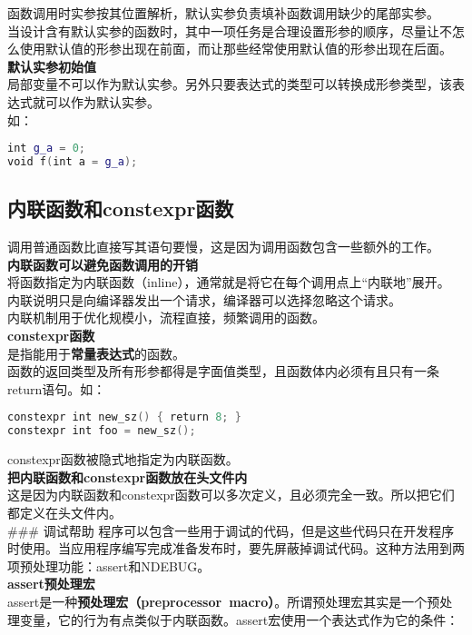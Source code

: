 \documentclass[
  a4paper,
  oneside,tablecaptionabove
]{scrbook}
\begin{document}
函数调用时实参按其位置解析，默认实参负责填补函数调用缺少的尾部实参。\\
当设计含有默认实参的函数时，其中一项任务是合理设置形参的顺序，尽量让不怎么使用默认值的形参出现在前面，而让那些经常使用默认值的形参出现在后面。\\
\textbf{默认实参初始值}\\
局部变量不可以作为默认实参。另外只要表达式的类型可以转换成形参类型，该表达式就可以作为默认实参。\\
如：

\begin{lstlisting}[language={C++}]
int g_a = 0;
void f(int a = g_a);
\end{lstlisting}

\subsection{内联函数和constexpr函数}\label{ux5185ux8054ux51fdux6570ux548cconstexprux51fdux6570}

调用普通函数比直接写其语句要慢，这是因为调用函数包含一些额外的工作。\\
\textbf{内联函数可以避免函数调用的开销}\\
将函数指定为内联函数（inline），通常就是将它在每个调用点上\enquote{内联地}展开。\\
内联说明只是向编译器发出一个请求，编译器可以选择忽略这个请求。\\
内联机制用于优化规模小，流程直接，频繁调用的函数。\\
\textbf{constexpr函数}\\
是指能用于\textbf{常量表达式}的函数。\\
函数的返回类型及所有形参都得是字面值类型，且函数体内必须有且只有一条return语句。如：

\begin{lstlisting}[language={C++}]
constexpr int new_sz() { return 8; }
constexpr int foo = new_sz();
\end{lstlisting}

constexpr函数被隐式地指定为内联函数。\\
\textbf{把内联函数和constexpr函数放在头文件内}\\
这是因为内联函数和constexpr函数可以多次定义，且必须完全一致。所以把它们都定义在头文件内。\\
\#\#\# 调试帮助
程序可以包含一些用于调试的代码，但是这些代码只在开发程序时使用。当应用程序编写完成准备发布时，要先屏蔽掉调试代码。这种方法用到两项预处理功能：assert和NDEBUG。\\
\textbf{assert预处理宏}\\
assert是一种\textbf{预处理宏（preprocessor~macro）}。所谓预处理宏其实是一个预处理变量，它的行为有点类似于内联函数。assert宏使用一个表达式作为它的条件：
\end{document}
